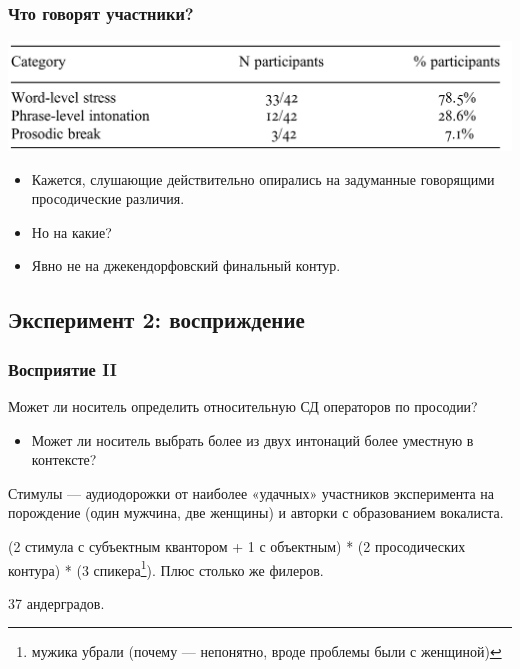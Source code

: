 \documentclass{beamer}
\begin{document}
\begin{frame}
    \frametitle{Что говорят участники?}

    \includegraphics[width=\textwidth]{images/responses.png}

    \begin{itemize}
        \item Кажется, слушающие действительно опирались на задуманные говорящими просодические различия.
        \item Но на какие?
        \item Явно не на джекендорфовский финальный контур.
    \end{itemize}

\end{frame}

\subsection{Эксперимент 2: восприждение}

\begin{frame}
    \frametitle{Восприятие II}

    Может ли носитель определить относительную СД операторов по просодии?

    \begin{itemize}
        \item Может ли носитель выбрать более из двух интонаций более уместную в контексте?
    \end{itemize}

    Стимулы — аудиодорожки от наиболее «удачных» участников эксперимента на порождение (один мужчина, две женщины) и авторки с образованием вокалиста.

    (2 стимула с субъектным квантором + 1 с объектным) * (2 просодических контура) * (3 спикера\footnote{мужика убрали (почему — непонятно, вроде проблемы были с женщиной)}). Плюс столько же филеров.

    \pause

    37 андерградов.

\end{frame}
\end{document}
